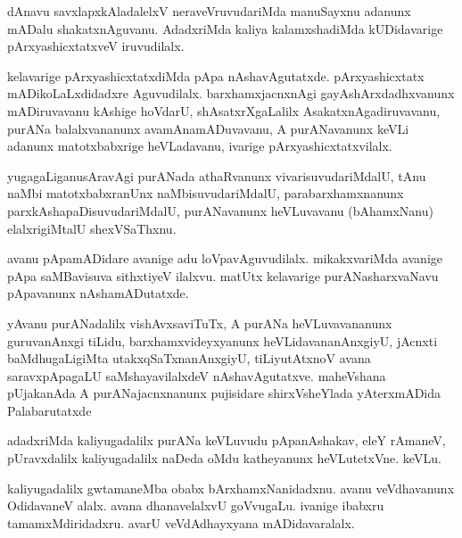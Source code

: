 \documentclass{article}
\begin{document}
\begin{mn}
dAnavu  savxlapxkAladalelxV  neraveVruvudariMda  manuSayxnu  adanunx  mADalu  shakatxnAguvanu.  AdadxriMda  
kaliya  kalamxshadiMda  kUDidavarige  pArxyashicxtatxveV  iruvudilalx.
\end{mn}

\begin{mn}
kelavarige  pArxyashicxtatxdiMda  pApa  nAshavAgutatxde.  pArxyashicxtatx  mADikoLaLxdidadxre  Aguvudilalx.  
barxhamxjacnxnAgi  gayAshArxdadhxvanunx  mADiruvavanu  kAshige  hoVdarU,  shAsatxrXgaLalilx  AsakatxnAgadiruvavanu,  
purANa  balalxvananunx  avamAnamADuvavanu,  A  purANavanunx  keVLi  adanunx  matotxbabxrige  heVLadavanu,  
ivarige  pArxyashicxtatxvilalx.
\end{mn}

\begin{mn}
yugagaLiganusAravAgi  purANada  athaRvanunx  vivarisuvudariMdalU,  tAnu  naMbi  matotxbabxranUnx  naMbisuvudariMdalU,  
parabarxhamxnanunx  parxkAshapaDisuvudariMdalU,  purANavanunx  heVLuvavanu (bAhamxNanu) elalxrigiMtalU  shexVSaThxnu.
\end{mn}

\begin{mn}
avanu  pApamADidare   avanige  adu  loVpavAguvudilalx.  mikakxvariMda  avanige  pApa  saMBavisuva  sithxtiyeV  
ilalxvu.  matUtx  kelavarige  purANasharxvaNavu  pApavanunx  nAshamADutatxde.
\end{mn}

\begin{mn}
yAvanu  purANadalilx  vishAvxsaviTuTx,  A  purANa  heVLuvavananunx  guruvanAnxgi  tiLidu,  barxhamxvideyxyanunx  
heVLidavananAnxgiyU,  jAcnxti  baMdhugaLigiMta  utakxqSaTxnanAnxgiyU,  tiLiyutAtxnoV  avana  saravxpApagaLU  
saMshayavilalxdeV  nAshavAgutatxve.  maheVshana  pUjakanAda  A  purANajacnxnanunx  pujisidare  shirxVsheYlada  
yAterxmADida  Palabarutatxde
\end{mn}

\begin{mn}
adadxriMda  kaliyugadalilx  purANa  keVLuvudu  pApanAshakav,  eleY  rAmaneV,  pUravxdalilx  kaliyugadalilx  
naDeda  oMdu  katheyanunx  heVLutetxVne.  keVLu.
\end{mn}

\begin{mn}
kaliyugadalilx  gwtamaneMba  obabx  bArxhamxNanidadxnu.  avanu  veVdhavanunx  OdidavaneV  alalx.  avana  
dhanavelalxvU  goVvugaLu.  ivanige  ibabxru  tamamxMdiridadxru.  avarU  veVdAdhayxyana  mADidavaralalx.
\end{mn}
\end{document}
